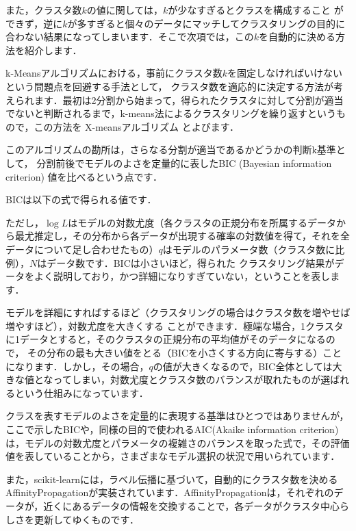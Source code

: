 また，クラスタ数$k$の値に関しては，$k$が少なすぎるとクラスを構成すること
ができず，逆に$k$が多すぎると個々のデータにマッチしてクラスタリングの目的に合わない結果になってしまいます．そこで次項では，この$k$を自動的に決める方法を紹介します．


k-Meansアルゴリズムにおける，事前にクラスタ数$k$を固定しなければいけないという問題点を回避する手法として，
クラスタ数を適応的に決定する方法が考えられます．最初は2分割から始まって，得られたクラスタに対して分割が適当
でないと判断されるまで，k-means法によるクラスタリングを繰り返すというもので，この方法を
X-meansアルゴリズム
とよびます．

このアルゴリズムの勘所は，さらなる分割が適当であるかどうかの判断k基準として，
分割前後でモデルのよさを定量的に表したBIC (Bayesian information criterion) 値を比べるという点です．

BICは以下の式で得られる値です．

ただし，$\log L$はモデルの対数尤度（各クラスタの正規分布を所属するデータから最尤推定し，その分布から各データが出現する確率の対数値を得て，それを全データについて足し合わせたもの）$q$はモデルのパラメータ数（クラスタ数に比例），$N$はデータ数です．BICは小さいほど，得られた
クラスタリング結果がデータをよく説明しており，かつ詳細になりすぎていない，ということを表します．

モデルを詳細にすればするほど（クラスタリングの場合はクラスタ数を増やせば増やすほど），対数尤度を大きくする
ことができます．極端な場合，1クラスタに1データとすると，そのクラスタの正規分布の平均値がそのデータになるので，
その分布の最も大きい値をとる（BICを小さくする方向に寄与する）ことになります．しかし，その場合，$q$の値が大きくなるので，BIC全体としては大きな値となってしまい，対数尤度とクラスタ数のバランスが取れたものが選ばれるという仕組みになっています．

クラスを表すモデルのよさを定量的に表現する基準はひとつではありませんが，ここで示したBICや，同様の目的で使われるAIC(Akaike information criterion)は，モデルの対数尤度とパラメータの複雑さのバランスを取った式で，その評価値を表していることから，さまざまなモデル選択の状況で用いられています．


また，scikit-learnには，ラベル伝播に基づいて，自動的にクラスタ数を決める AffinityPropagationが実装されています．AffinityPropagationは，それぞれのデータが，近くにあるデータの情報を交換することで，各データがクラスタ中心らしさを更新してゆくものです．


